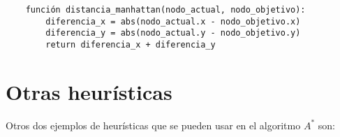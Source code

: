\begin{verbatim}
    función distancia_manhattan(nodo_actual, nodo_objetivo):
        diferencia_x = abs(nodo_actual.x - nodo_objetivo.x)
        diferencia_y = abs(nodo_actual.y - nodo_objetivo.y)
        return diferencia_x + diferencia_y
    \end{verbatim}

\section{Otras heurísticas}

Otros dos ejemplos de heurísticas que se pueden usar en el algoritmo $A^{*}$ son:

